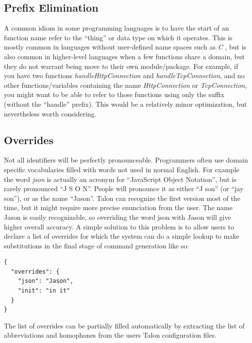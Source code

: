 \documentclass[../thesis.tex]{subfiles}
\begin{document}
\subsection{Prefix Elimination}\label{prefix_elimination}
A common idiom in some programming languages is to have the start of an function name refer to the ``thing''
or data type on which it operates. This is mostly common in languages without user-defined name spaces such as \textit{C}
, but is also common in higher-level languages when a few functions share a domain, but they do not warrant
being move to their own module/package.
For example, if you have two functions \textit{handleHttpConnection} and \textit{handleTcpConnection}, and no other
functions/variables containing the name \textit{HttpConnection} or \textit{TcpConnection}, you might want to
be able to refer to those functions using only the suffix (without the ``handle'' prefix).
This would be a relatively minor optimization, but nevertheless worth considering.

\subsection{Overrides}\label{overrides}
Not all identifiers will be perfectly pronounceable.
Programmers often use domain specific vocabularies filled with words not used in normal English.
For example the word \textit{json} is actually an acronym for ``JavaScript Object Notation'', but is rarely
pronounced ``J S O N''.
People will pronounce it as either ``J son'' (or ``jay son''), or as the name ``Jason''.
Talon can recognize the first version most of the time, but it might require more precise enunciation from the user.
The name Jason is easily recognizable, so overriding the word json with Jason will give higher overall accuracy.
A simple solution to this problem is to allow users to declare a list of overrides for which the system
can do a simple lookup to make substitutions in the final stage of command generation like so:
\begin{verbatim}
{
  "overrides": {
    "json": "Jason",
    "init": "in it"
  }
}
\end{verbatim}
The list of overrides can be partially filled automatically by extracting the list of abbreviations and homophones
from the users Talon configuration files.
\end{document}
